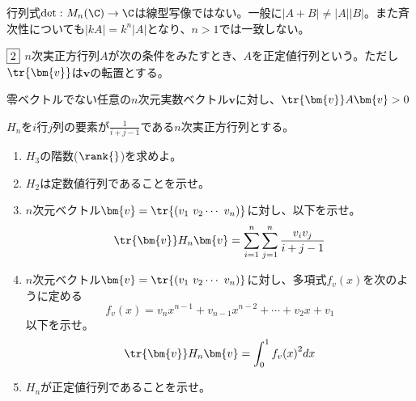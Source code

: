 \documentclass[dvipdfmx]{jsreport}
\begin{document}
\begin{souanswer}
\begin{enumerate}
\begin{enumerate_alpha}
	\item 行列式$\det{}\colon M_n(\C)\to \C$は線型写像ではない。一般に$|A+ B|\ne |A||B|$。また斉次性についても$|kA|= k^n|A|$となり、$n> 1$では一致しない。
\end{enumerate_alpha}
\end{enumerate}
\end{souanswer}

\begin{tcolorbox} %
	$\fbox{2}$ $n$次実正方行列$A$が次の条件をみたすとき、$A$を正定値行列という。ただし$\tr{\bm{v}}$は$\bm{v}$の転置とする。
\begin{tcolorbox}
	零ベクトルでない任意の$n$次元実数ベクトル$\bm{v}$に対し、$\tr{\bm{v}} A\bm{v}> 0$
\end{tcolorbox}
	$H_n$を$i$行$j$列の要素が$\frac{1}{i+ j- 1}$である$n$次実正方行列とする。
\begin{enumerate}
	\item $H_3$の階数($\rank{}$)を求めよ。
	\item $H_2$は定数値行列であることを示せ。
	\item $n$次元ベクトル$\bm{v}= \tr{(v_1\ v_2\cdots\ v_n)}$に対し、以下を示せ。
\begin{equation*}
	\tr{\bm{v}} H_n\bm{v}= \sum_{i= 1}^n\sum_{j= 1}^n \frac{v_i v_j}{i+ j-1}
\end{equation*}
	\item $n$次元ベクトル$\bm{v}= \tr{(v_1\ v_2\cdots\ v_n)}$に対し、多項式$f_v(x)$を次のように定める
\begin{equation*}
	f_v(x)= v_n x^{n-1}+ v_{n- 1} x^{n- 2}+ \cdots+ v_2 x+ v_1
\end{equation*}
	以下を示せ。
\begin{equation*}
	\tr{\bm{v}} H_n\bm{v}= \int_0^1 {f_v(x)}^2 dx
\end{equation*}
	\item $H_n$が正定値行列であることを示せ。
\end{enumerate}
\end{tcolorbox}
\end{document}

